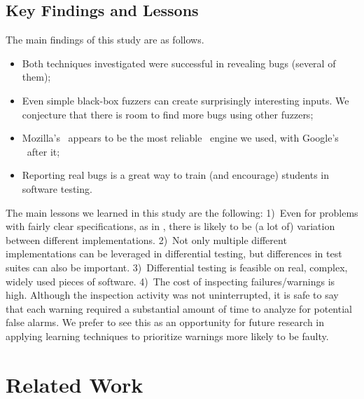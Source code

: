 \documentclass[sigconf,review, anonymous]{acmart}
\begin{document}

\subsection{Key Findings and Lessons}
\label{sec:lessons}

The main findings of this study are as follows.

\begin{itemize}
  \item Both techniques investigated were successful in revealing
    bugs (several of them);
  \item Even simple black-box fuzzers can create surprisingly
    interesting inputs. We conjecture that there is room to find more
    bugs using other fuzzers;
  \item Mozilla's \smonkey\ appears to be the most reliable
    \js\ engine we used, with Google's \veight\ after it;
  \item Reporting real bugs is a great way to train (and encourage)
    students in software testing.
\end{itemize}

The main lessons we learned in this study are the following: 1)~Even
for problems with fairly clear specifications, as in \javascript{},
there is likely to be (a lot of) variation between different
implementations. 2)~Not only multiple different implementations can be
leveraged in differential testing, but differences in test suites can
also be important. 3)~Differential testing is feasible on real,
complex, widely used pieces of software. 4)~The cost of inspecting
failures/warnings is high. Although the inspection activity was not
uninterrupted, it is safe to say that each warning required a
substantial amount of time to analyze for potential false alarms. We
prefer to see this as an opportunity for future research in applying
learning techniques to prioritize warnings more likely to be faulty.

\section{Related Work}
\label{sec:related-work}
\end{document}

